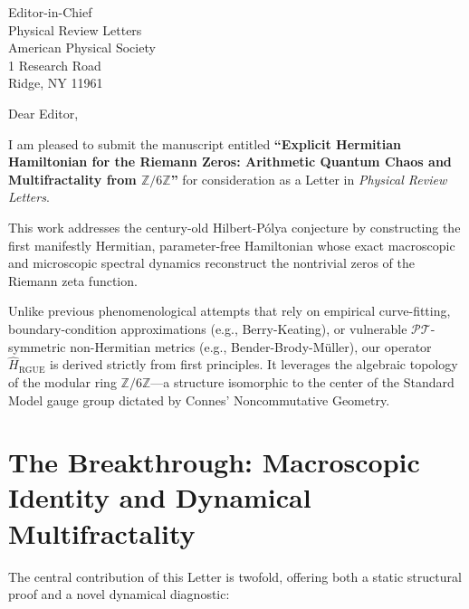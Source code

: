 \documentclass[11pt,a4paper]{letter}
\begin{document}
\address{
    \textbf{José Ignacio Peinador Sala}\\
    Independent Researcher\\
    Valladolid, Spain\\
    \href{mailto:joseignacio.peinador@gmail.com}{joseignacio.peinador@gmail.com}
}

\date{\today}

\begin{letter}{
    Editor-in-Chief\\
    Physical Review Letters\\
    American Physical Society\\
    1 Research Road\\
    Ridge, NY 11961
}

\opening{Dear Editor,}

I am pleased to submit the manuscript entitled \textbf{``Explicit Hermitian Hamiltonian for the Riemann Zeros: Arithmetic Quantum Chaos and Multifractality from $\mathbb{Z}/6\mathbb{Z}$''} for consideration as a Letter in \textit{Physical Review Letters}.

This work addresses the century-old Hilbert-Pólya conjecture by constructing the first manifestly Hermitian, parameter-free Hamiltonian whose exact macroscopic and microscopic spectral dynamics reconstruct the nontrivial zeros of the Riemann zeta function. 

Unlike previous phenomenological attempts that rely on empirical curve-fitting, boundary-condition approximations (e.g., Berry-Keating), or vulnerable $\mathcal{PT}$-symmetric non-Hermitian metrics (e.g., Bender-Brody-Müller), our operator $\hat{H}_{\text{RGUE}}$ is derived strictly from first principles. It leverages the algebraic topology of the modular ring $\mathbb{Z}/6\mathbb{Z}$—a structure isomorphic to the center of the Standard Model gauge group dictated by Connes' Noncommutative Geometry.

\section*{The Breakthrough: Macroscopic Identity and Dynamical Multifractality}

The central contribution of this Letter is twofold, offering both a static structural proof and a novel dynamical diagnostic:


\end{letter}
\end{document}
